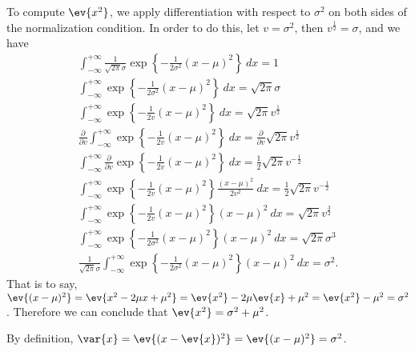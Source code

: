 \begin{answer}{}
	To compute $\ev{x^2}$, we apply differentiation with respect to $\sigma^2$ on both sides of the normalization condition. In order to do this, let $v = \sigma^2$, then $v^{\frac{1}{2}} = \sigma$, and we have
	\begin{gather}
		\int_{-\infty}^{+\infty} \frac{1}{\sqrt{2\pi}\sigma}\exp\left\{ -\frac{1}{2\sigma^2} (x-\mu)^2 \right\}\ dx = 1\\
		\int_{-\infty}^{+\infty} \exp\left\{ -\frac{1}{2\sigma^2} (x-\mu)^2 \right\}\ dx = \sqrt{2\pi} \sigma\\
		\int_{-\infty}^{+\infty} \exp\left\{ -\frac{1}{2v} (x-\mu)^2 \right\}\ dx = \sqrt{2\pi} v^{\frac{1}{2}}\\
		\frac{\partial}{\partial v} \int_{-\infty}^{+\infty} \exp\left\{ -\frac{1}{2v} (x-\mu)^2 \right\}\ dx = \frac{\partial}{\partial v}\sqrt{2\pi} v^{\frac{1}{2}}\\
		\int_{-\infty}^{+\infty} \frac{\partial}{\partial v}\exp\left\{ -\frac{1}{2v} (x-\mu)^2 \right\}\ dx = \frac{1}{2}\sqrt{2\pi} v^{-\frac{1}{2}}\\
		\int_{-\infty}^{+\infty} \exp\left\{ -\frac{1}{2v} (x-\mu)^2 \right\} \frac{(x-\mu)^2}{2v^2}\ dx = \frac{1}{2}\sqrt{2\pi} v^{-\frac{1}{2}}\\
		\int_{-\infty}^{+\infty} \exp\left\{ -\frac{1}{2v} (x-\mu)^2 \right\} (x-\mu)^2\ dx = \sqrt{2\pi}v^{\frac{3}{2}}\\
		\int_{-\infty}^{+\infty} \exp\left\{ -\frac{1}{2\sigma^2} (x-\mu)^2 \right\} (x-\mu)^2\ dx = \sqrt{2\pi}\sigma^3\\
		\frac{1}{\sqrt{2\pi}\sigma} \int_{-\infty}^{+\infty} \exp\left\{ -\frac{1}{2\sigma^2} (x-\mu)^2 \right\} (x-\mu)^2\ dx = \sigma^2.
	\end{gather}
	That is to say, $\ev{(x - \mu)^2} = \ev{x^2 - 2\mu x + \mu^2} = \ev{x^2} -2\mu\ev{x} + \mu^2 = \ev{x^2} - \mu^2 = \sigma^2$. Therefore we can conclude that $\ev{x^2} = \sigma^2 + \mu^2$.
	
	By definition, $\var{x} = \ev{(x - \ev{x})^2} = \ev{(x - \mu)^2} = \sigma^2$.
\end{answer}